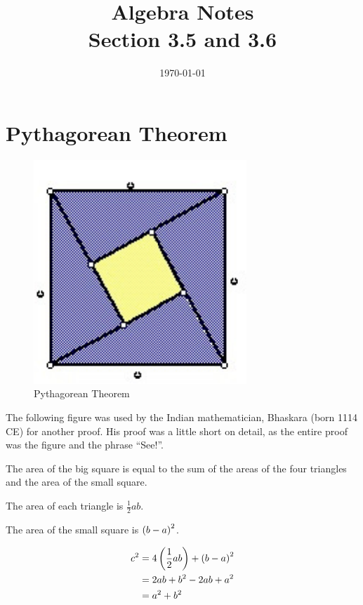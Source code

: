 \documentclass[letterpaper, landscape]{exam}
\title{Algebra Notes \\ Section 3.5 and 3.6 }
\author{}
\date{\today}
\begin{document}
  \maketitle

  \section{Pythagorean Theorem} %

  \begin{figure}[H]
    \centering
    \includegraphics{proof.pdf}
    \caption{Pythagorean Theorem}
  \end{figure}
  
  The following figure was used by the Indian mathematician, Bhaskara (born 1114 CE) for another
  proof.  His proof was a little short on detail, as the entire proof was the figure and the phrase
  ``See!''.  

  The area of the big square is equal to the sum of the areas of the four triangles and the area
  of the small square.

  \begin{itemize*} 
    \item The area of each triangle is $\frac{1}{2} ab $.
    \item The area of the small square is $\del{ b - a }^2$.  
  \end{itemize*}

  \begin{align*} 
    c^2 & = 4 \del{ \frac{1}{2} ab } + \del{ b - a }^2 \\
        & = 2ab + b^2 - 2ab + a^2 \\
        & = a^2 + b^2 \\
  \end{align*}
\end{document}
